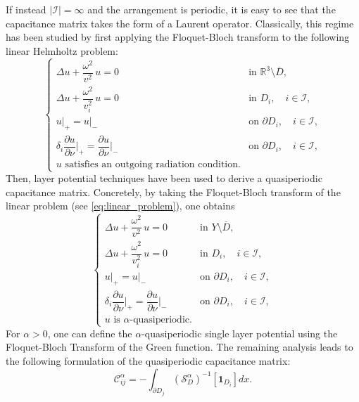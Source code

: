 \documentclass[a4paper,reqno,twoside]{amsart}
\numberwithin{equation}{section}
\theoremstyle{definition}
\newcommand{\<}{\ensuremath \leq}
\renewcommand{\>}{\ensuremath \geq}
\begin{document}
If instead $\lvert \mathcal{I}\rvert = \infty$ and the arrangement is periodic, it is easy to see that the capacitance matrix takes the form of a Laurent operator. Classically, this regime has been studied by first applying the Floquet-Bloch transform to the following linear Helmholtz problem: 
\begin{equation}\label{eq:linear_problem}
    \begin{cases}
        \Delta u + \dfrac{\omega^2}{v^2}\, u = 0
        & \text{in } \mathbb{R}^3 \setminus \overline{D}, \\[0.8em]
        \Delta u + \dfrac{\omega^2}{v_i^2}\, u
         = 0
        & \text{in } D_i, \quad i \in \mathcal{I}, \\[0.8em]
        u\big|_+ = u\big|_-
        & \text{on } \partial D_i, \quad i \in \mathcal{I}, \\[0.8em]
        \delta_i \dfrac{\partial u}{\partial \nu}\bigg|_+
        = \dfrac{\partial u}{\partial \nu}\bigg|_-
        & \text{on } \partial D_i, \quad i \in \mathcal{I}, \\[0.8em]
        u \text{ satisfies an outgoing radiation condition.}
    \end{cases}
\end{equation}
Then, layer potential techniques have been used to derive a quasiperiodic capacitance matrix. Concretely, by taking the Floquet-Bloch transform of the linear problem (see \ref{eq:linear_problem}), one obtains
\begin{equation}\label{eq:linear_problemqp}
    \begin{cases}
        \Delta u + \dfrac{\omega^2}{v^2}\, u = 0
        & \text{in } Y \setminus \overline{D}, \\[0.8em]
        \Delta u + \dfrac{\omega^2}{v_i^2}\, u
         = 0
        & \text{in } D_i, \quad i \in \mathcal{I}, \\[0.8em]
        u\big|_+ = u\big|_-
        & \text{on } \partial D_i, \quad i \in \mathcal{I}, \\[0.8em]
        \delta_i \dfrac{\partial u}{\partial \nu}\bigg|_+
        = \dfrac{\partial u}{\partial \nu}\bigg|_-
        & \text{on } \partial D_i, \quad i \in \mathcal{I}, \\[0.8em]
        u \text{ is $\alpha$-quasiperiodic.}
    \end{cases}
\end{equation}
For $\alpha>0$, one can define the $\alpha$-quasiperiodic single layer potential using the Floquet-Bloch Transform of the Green function. The remaining analysis leads to the following formulation of the quasiperiodic capacitance matrix:
\begin{equation}
    \mathcal{C}^\alpha_{ij} = -\int_{\partial D_j}(\mathcal{S}_D^\alpha)^{-1}[\mathbf{1}_{D_i}]dx.
\end{equation}
\end{document}
